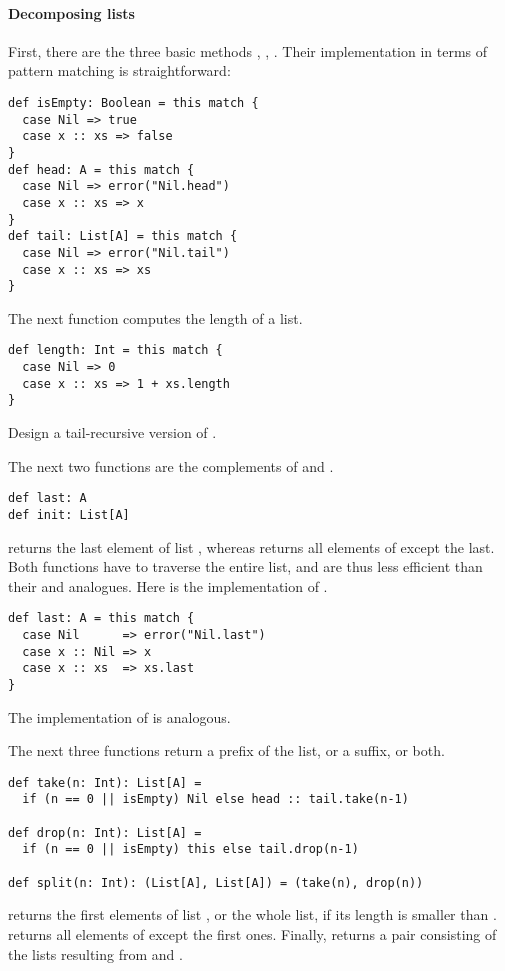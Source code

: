 \paragraph{Decomposing lists}
First, there are the three basic methods ,
, . Their implementation in terms of pattern
matching is straightforward:
\begin{lstlisting}
def isEmpty: Boolean = this match {
  case Nil => true
  case x :: xs => false
}
def head: A = this match {
  case Nil => error("Nil.head")
  case x :: xs => x
}
def tail: List[A] = this match {
  case Nil => error("Nil.tail")
  case x :: xs => xs
}
\end{lstlisting}

The next function computes the length of a list.
\begin{lstlisting}
def length: Int = this match {
  case Nil => 0
  case x :: xs => 1 + xs.length
}
\end{lstlisting}
\begin{exercise} Design a tail-recursive version of .
\end{exercise}

The next two functions are the complements of  and
.
\begin{lstlisting}
def last: A
def init: List[A]
\end{lstlisting}
 returns the last element of list , whereas
 returns all elements of  except the last.
Both functions have to traverse the entire list, and are thus less
efficient than their  and  analogues.
Here is the implementation of .
\begin{lstlisting}
def last: A = this match {
  case Nil      => error("Nil.last")
  case x :: Nil => x
  case x :: xs  => xs.last
}
\end{lstlisting}
The implementation of  is analogous.

The next three functions return a prefix of the list, or a suffix, or
both.
\begin{lstlisting}
def take(n: Int): List[A] =
  if (n == 0 || isEmpty) Nil else head :: tail.take(n-1)

def drop(n: Int): List[A] =
  if (n == 0 || isEmpty) this else tail.drop(n-1)

def split(n: Int): (List[A], List[A]) = (take(n), drop(n))
\end{lstlisting}
 returns the first  elements of list
, or the whole list, if its length is smaller than .
 returns all elements of  except the
 first ones. Finally,  returns a pair
consisting of the lists resulting from  and
.

